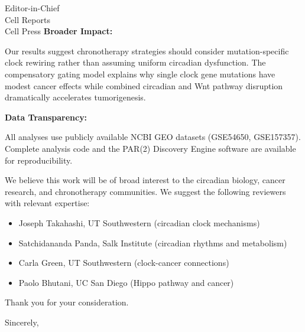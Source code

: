 \documentclass[11pt,letterpaper]{letter}
\begin{document}
\begin{letter}{Editor-in-Chief\\Cell Reports\\Cell Press}
\textbf{Broader Impact:}

Our results suggest chronotherapy strategies should consider mutation-specific clock rewiring rather than assuming uniform circadian dysfunction. The compensatory gating model explains why single clock gene mutations have modest cancer effects while combined circadian and Wnt pathway disruption dramatically accelerates tumorigenesis.

\textbf{Data Transparency:}

All analyses use publicly available NCBI GEO datasets (GSE54650, GSE157357). Complete analysis code and the PAR(2) Discovery Engine software are available for reproducibility.

We believe this work will be of broad interest to the circadian biology, cancer research, and chronotherapy communities. We suggest the following reviewers with relevant expertise:

\begin{itemize}
\item Joseph Takahashi, UT Southwestern (circadian clock mechanisms)
\item Satchidananda Panda, Salk Institute (circadian rhythms and metabolism)
\item Carla Green, UT Southwestern (clock-cancer connections)
\item Paolo Bhutani, UC San Diego (Hippo pathway and cancer)
\end{itemize}

Thank you for your consideration.

\closing{Sincerely,}

\end{letter}
\end{document}
